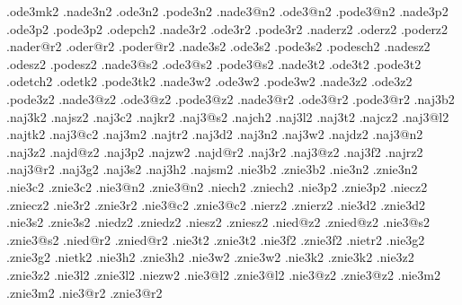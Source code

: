 {             .ode3mk2  
  .nade3n2   .ode3n2   .pode3n2   
  .nade3@n2  .ode3@n2  .pode3@n2  
  .nade3p2   .ode3p2   .pode3p2   
             .odepch2  
  .nade3r2   .ode3r2   .pode3r2   
  .naderz2   .oderz2   .poderz2   
  .nader@r2  .oder@r2  .poder@r2  
  .nade3s2   .ode3s2   .pode3s2   
                       .podesch2  
  .nadesz2   .odesz2   .podesz2   
  .nade3@s2  .ode3@s2  .pode3@s2  
  .nade3t2   .ode3t2   .pode3t2   
             .odetch2
             .odetk2   .pode3tk2  
  .nade3w2   .ode3w2   .pode3w2   
  .nade3z2   .ode3z2   .pode3z2   
  .nade3@z2  .ode3@z2  .pode3@z2  
  .nade3@r2  .ode3@r2  .pode3@r2  
%
%
  .naj3b2                       .naj3k2                       .najsz2     
  .naj3c2                       .najkr2                       .naj3@s2    
  .najch2                       .naj3l2                       .naj3t2     
  .najcz2                       .naj3@l2                      .najtk2
  .naj3@c2                      .naj3m2                       .najtr2  
  .naj3d2                       .naj3n2                       .naj3w2     
  .najdz2                       .naj3@n2                      .naj3z2     
  .najd@z2                      .naj3p2                       .najzw2
  .najd@r2                      .naj3r2                       .naj3@z2    
  .naj3f2                       .najrz2                       .naj3@r2    
  .naj3g2                       .naj3s2     
  .naj3h2                       .najsm2
%
% 
  .nie3b2     .znie3b2                         .nie3n2     .znie3n2
  .nie3c2     .znie3c2                         .nie3@n2    .znie3@n2
  .niech2     .zniech2                         .nie3p2     .znie3p2
  .niecz2     .zniecz2                         .nie3r2     .znie3r2
  .nie3@c2    .znie3@c2                        .nierz2     .znierz2
  .nie3d2     .znie3d2                         .nie3s2     .znie3s2
  .niedz2     .zniedz2                         .niesz2     .zniesz2
  .nied@z2    .znied@z2                        .nie3@s2    .znie3@s2
  .nied@r2    .znied@r2                        .nie3t2     .znie3t2
  .nie3f2     .znie3f2                         .nietr2     
  .nie3g2     .znie3g2                         .nietk2     
  .nie3h2     .znie3h2                         .nie3w2     .znie3w2
  .nie3k2     .znie3k2                         .nie3z2     .znie3z2
  .nie3l2     .znie3l2                         .niezw2  
  .nie3@l2    .znie3@l2                        .nie3@z2    .znie3@z2
  .nie3m2     .znie3m2                         .nie3@r2    .znie3@r2
%
}
